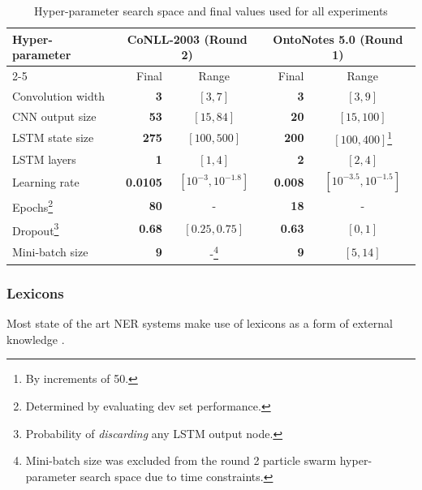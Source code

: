\documentclass[11pt,letterpaper]{article}
\begin{document}


\begin{savenotes}
\begin{table}[t]
\begin{center}
\small
\begin{tabular}{|l|r|c|r|c|}
\hline \multirow{2}{*}{\bf Hyper-parameter} & \multicolumn{2}{c|}{\bf CoNLL-2003 (Round 2)} & \multicolumn{2}{c|}{\bf OntoNotes 5.0 (Round 1)} \\ \cline{2-5}
& Final & Range & Final & Range \\ \hline
Convolution width & \bf 3 & $[3,7]$ & \bf 3 & $[3,9]$ \\
CNN output size & \bf 53 & $[15,84]$ & \bf 20 & $[15,100]$ \\
LSTM state size & \bf 275 & $[100,500]$ & \bf 200 & $[100,400]$\footnote{By increments of 50.}\\
LSTM layers & \bf 1 & $[1,4]$ & \bf 2 & $[2,4]$ \\
Learning rate & \bf 0.0105 & $[10^{-3},10^{-1.8}]$ & \bf 0.008 & $[10^{-3.5},10^{-1.5}]$ \\
Epochs\footnote{Determined by evaluating dev set performance.} & \bf 80 & \-- & \bf 18 & \-- \\
Dropout\footnote{Probability of \emph{discarding} any LSTM output node.} & \bf 0.68 & $[0.25,0.75]$ & \bf \bf 0.63 & $[0,1]$\\
Mini-batch size & \bf 9 & \--\footnote{Mini-batch size was  excluded from the round 2 particle swarm hyper-parameter search space due to time constraints.} & \bf 9 & $[5,14]$ \\
\hline
\end{tabular}
\end{center}
\caption{Hyper-parameter search space and final values used for all experiments}
\label{tab:hyperparams}
\end{table}
\end{savenotes}


\subsubsection{Lexicons}
Most state of the art NER systems make use of lexicons as a form of external knowledge \cite{ratinov2009,passos2014}. 
\end{document}
